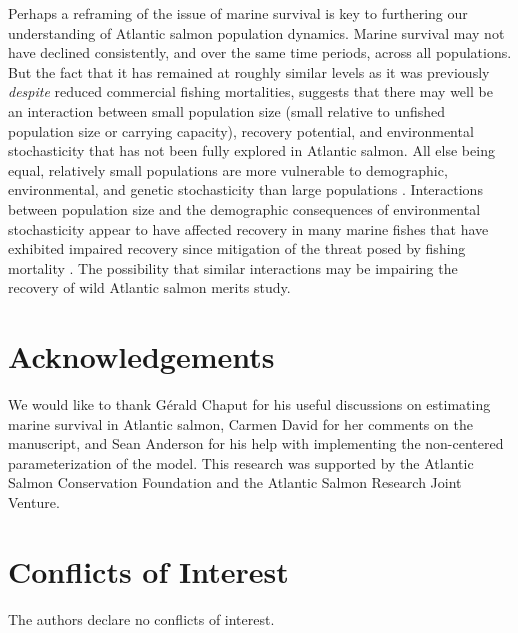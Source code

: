 \documentclass[12pt]{article}
\begin{document}
Perhaps a reframing of the issue of marine survival is key to furthering our
understanding of Atlantic salmon population dynamics. Marine survival may not
have declined consistently, and over the same time periods, across all
populations. 
But the fact that it has remained at roughly similar levels as it was
previously \emph{despite} reduced commercial fishing mortalities, suggests
that there may well be an interaction between small population size (small
relative to unfished population size or carrying capacity), recovery
potential, and environmental stochasticity that has not been fully explored in
Atlantic salmon. 
All else being equal, relatively small populations are more vulnerable to
demographic, environmental, and genetic stochasticity than large populations
\citep{Lande1993, Hutchings2015}. Interactions between population size and the
demographic consequences of environmental stochasticity appear to have
affected recovery in many marine fishes that have exhibited impaired recovery
since mitigation of the threat posed by fishing mortality
\citep{Hutchings2017, Hutchings2020}. The possibility that similar
interactions may be impairing the recovery of wild Atlantic salmon merits
study.

\section*{Acknowledgements}

We would like to thank G\'{e}rald Chaput for his useful discussions on
estimating marine survival in Atlantic salmon, Carmen David for her comments
on the manuscript, and Sean Anderson for his help with implementing the
non-centered parameterization of the model. This research was supported by the
Atlantic Salmon Conservation Foundation and the Atlantic Salmon Research Joint
Venture.

\section*{Conflicts of Interest}

The authors declare no conflicts of interest.
 


%
\end{document}
